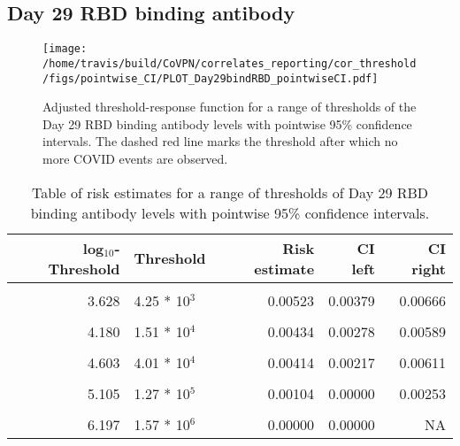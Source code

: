 \documentclass[]{book}
\theoremstyle{definition}
\theoremstyle{definition}
\theoremstyle{definition}
\newcommand{\1}{\mathbbm{1}}
\begin{document}
\clearpage

\clearpage

\hypertarget{day-29-rbd-binding-antibody}{%
\subsection{Day 29 RBD binding antibody}\label{day-29-rbd-binding-antibody}}

\begin{figure}[H]
\centering
\texttt{[image: /home/travis/build/CoVPN/correlates\_reporting/cor\_threshold/figs/pointwise\_CI/PLOT\_Day29bindRBD\_pointwiseCI.pdf]}
\caption{Adjusted threshold-response function for a range of thresholds of the
  Day 29 RBD binding antibody levels with pointwise 95\% confidence intervals. The dashed red line marks the threshold after which no more COVID events are observed. }
\end{figure}
\begin{table}[!h]

\caption{\label{tab:unnamed-chunk-357}Table of risk estimates for a range of thresholds of Day 29 RBD binding antibody levels with pointwise 95\% confidence intervals.}
\centering
\begin{tabular}[t]{rlrrr}
\toprule
log$_{10}$-Threshold & Threshold & Risk estimate & CI left & CI right\\
\midrule
\cellcolor{gray!6}{2.882} & \cellcolor{gray!6}{7.62 * 10$^2$} & \cellcolor{gray!6}{0.00576} & \cellcolor{gray!6}{0.00435} & \cellcolor{gray!6}{0.00718}\\
3.628 & 4.25 * 10$^3$ & 0.00523 & 0.00379 & 0.00666\\
\cellcolor{gray!6}{3.889} & \cellcolor{gray!6}{7.74 * 10$^3$} & \cellcolor{gray!6}{0.00459} & \cellcolor{gray!6}{0.00316} & \cellcolor{gray!6}{0.00602}\\
4.180 & 1.51 * 10$^4$ & 0.00434 & 0.00278 & 0.00589\\
\cellcolor{gray!6}{4.395} & \cellcolor{gray!6}{2.48 * 10$^4$} & \cellcolor{gray!6}{0.00486} & \cellcolor{gray!6}{0.00298} & \cellcolor{gray!6}{0.00674}\\
4.603 & 4.01 * 10$^4$ & 0.00414 & 0.00217 & 0.00611\\
\cellcolor{gray!6}{4.826} & \cellcolor{gray!6}{6.70 * 10$^4$} & \cellcolor{gray!6}{0.00365} & \cellcolor{gray!6}{0.00148} & \cellcolor{gray!6}{0.00583}\\
5.105 & 1.27 * 10$^5$ & 0.00104 & 0.00000 & 0.00253\\
\cellcolor{gray!6}{5.422} & \cellcolor{gray!6}{2.64 * 10$^5$} & \cellcolor{gray!6}{0.00097} & \cellcolor{gray!6}{0.00000} & \cellcolor{gray!6}{0.00298}\\
6.197 & 1.57 * 10$^6$ & 0.00000 & 0.00000 & NA\\
\bottomrule
\end{tabular}
\end{table}
\end{document}

